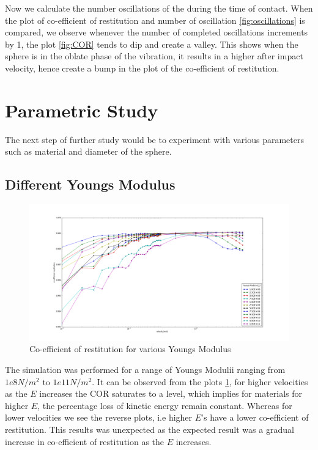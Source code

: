 Now we calculate the number oscillations of the during the time of contact. When the plot of co-efficient of restitution and number of oscillation \ref{fig:oscillations} is compared, we observe whenever the number of completed oscillations increments by 1, the plot \ref{fig:COR} tends to dip and create a valley. This shows when the sphere is in the oblate  phase of the vibration, it results in a higher after impact velocity, hence create a bump in the plot of the co-efficient of restitution.




\section{Parametric Study}

The next step of further study would be to experiment with various parameters such as material and diameter of the sphere.


\subsection{Different Youngs Modulus}

\begin{figure}[H]
\includegraphics[width=1.0\textwidth]{../images/parametricStudy/COR.png}
\caption{Co-efficient of restitution for various Youngs Modulus}
\label{fig:CORdiffEcomplete}
\end{figure}

The simulation was performed for a range of Youngs Modulii ranging from $1e8N/m^{2}$ to $1e11N/m^{2}$. It can be observed from the plots \ref{fig:CORdiffEcomplete}, for higher velocities as the $E$ increases the COR saturates to a level, which implies for materials for higher $E$, the percentage loss of kinetic energy remain constant. Whereas for lower velocities we see the reverse plots, i.e higher $E$'s have a lower co-efficient of restitution. This results was unexpected as the expected result was a gradual increase in co-efficient of restitution as the $E$ increases. 

